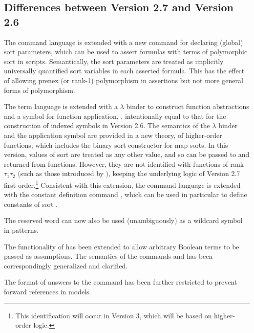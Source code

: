 \subsection{Differences between Version 2.7 and Version 2.6}

The command language is extended with a new command for declaring (global)
sort parameters, which can be used to assert formulas with terms 
of polymorphic sort in scripts.
Semantically, the sort parameters are treated as implicitly universally quantified 
sort variables in each asserted formula.
This has the effect of allowing prenex (or rank-1) polymorphism in assertions 
but not more general forms of polymorphism.

The term language is extended with a $\lambda$ binder to construct 
function abstractions and a symbol for function application, ,
intentionally equal to that for the construction of indexed symbols 
in Version 2.6.
The semantics of the $\lambda$ binder and the application symbol are provided
in a new theory, of higher-order functions, which includes 
the binary sort constructor \ter{->} for map sorts.
In this version, values of sort  are treated as 
any other value, and so can be passed to and returned from functions.
However, they are not identified with functions of rank $\tau_1\tau_2$
(such as those introduced by ),
keeping the underlying logic of Version 2.7 first order.\footnote{%
This identification will occur in Version 3, which will be based 
on higher-order logic.
}
Consistent with this extension, the command language is extended 
with the constant definition command , 
which can be used in particular to define constants 
of sort .

The reserved word \ter{\_} can now also be used (unambiguously) as a wildcard symbol in  patterns.

The functionality of  has been extended to allow
arbitrary Boolean terms to be passed as assumptions.  The semantics of
the commands  and  has been
correspondingly generalized and clarified.

The format of answers to the  command has been further restricted
to prevent forward references in models.

